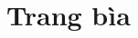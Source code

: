 \documentclass{article}
\begin{document}
\section{Trang bìa}




\thispagestyle{empty}


\end{document}
